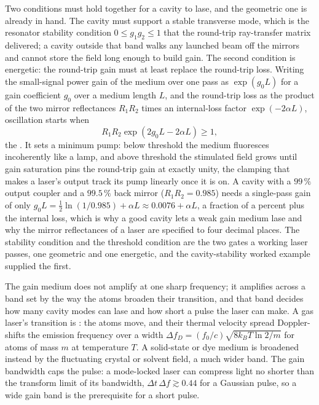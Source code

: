 Two conditions must hold together for a cavity to lase, and the geometric one is
already in hand. The cavity must support a stable transverse mode, which is the
resonator stability condition $0 \le g_1 g_2 \le 1$ that the round-trip
ray-transfer matrix delivered; a cavity outside that band walks any launched
beam off the mirrors and cannot store the field long enough to build gain. The
second condition is energetic: the round-trip gain must at least replace the
round-trip loss. Writing the small-signal power gain of the medium over one pass
as $\exp(g_0 L)$ for a gain coefficient $g_0$ over a medium length $L$, and the
round-trip loss as the product of the two mirror reflectances $R_1 R_2$ times an
internal-loss factor $\exp(-2\alpha L)$, oscillation starts when
\[
R_1 R_2 \exp(2 g_0 L - 2\alpha L) \ge 1,
\]
the . It sets a minimum pump: below threshold the
medium fluoresces incoherently like a lamp, and above threshold the stimulated
field grows until gain saturation pins the round-trip gain at exactly unity, the
clamping that makes a laser's output track its pump linearly once it is on. A
cavity with a $99\,\%$ output coupler and a $99.5\,\%$ back mirror
($R_1 R_2 = 0.985$) needs a single-pass gain of only
$g_0 L = \tfrac{1}{2}\ln(1/0.985) + \alpha L \approx 0.0076 + \alpha L$, a
fraction of a percent plus the internal loss, which is why a good cavity lets a
weak gain medium lase and why the mirror reflectances of a laser are specified to
four decimal places. The stability condition and the threshold condition are the
two gates a working laser passes, one geometric and one energetic, and the
cavity-stability worked example supplied the first.

The gain medium does not amplify at one sharp frequency; it amplifies across a
band set by the way the atoms broaden their transition, and that band decides how
many cavity modes can lase and how short a pulse the laser can make. A gas laser's
transition is : the atoms move, and their thermal
velocity spread Doppler-shifts the emission frequency over a width
$\Delta f_D = (f_0/c)\sqrt{8 k_B T\ln 2/m}$ for atoms of mass $m$ at temperature
$T$. A solid-state or dye medium is broadened instead by the fluctuating crystal
or solvent field, a much wider band. The gain bandwidth caps the pulse: a
mode-locked laser can compress light no shorter than the transform limit of its
bandwidth, $\Delta t\,\Delta f \gtrsim 0.44$ for a Gaussian pulse, so a wide gain
band is the prerequisite for a short pulse.

